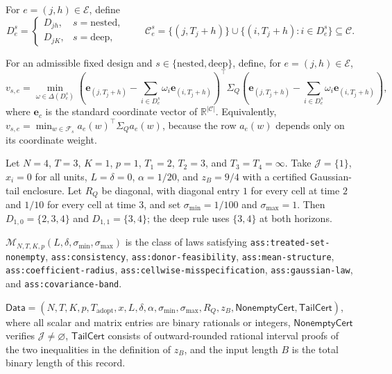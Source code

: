 For \(e=(j,h)\in\mathcal E\), define
\[
 D^s_e=
 \begin{cases}
 D_{jh},&s=\mathrm{nested},\\
 D_{jK},&s=\mathrm{deep},
 \end{cases}
 \qquad
 \mathcal C^s_e=
 \{(j,T_j+h)\}\cup\{(i,T_j+h):i\in D^s_e\}\subseteq\mathcal C.
\]

For an admissible fixed design and \(s\in\{\mathrm{nested},\mathrm{deep}\}\),
define, for \(e=(j,h)\in\mathcal E\),
\[
 v_{s,e}=\min_{\omega\in\Delta(D^s_e)}
 \left(\mathbf e_{(j,T_j+h)}-
       \sum_{i\in D^s_e}\omega_i\mathbf e_{(i,T_j+h)}\right)^{\!\top}
 \Sigma_Q
 \left(\mathbf e_{(j,T_j+h)}-
       \sum_{i\in D^s_e}\omega_i\mathbf e_{(i,T_j+h)}\right),
\]
where \(\mathbf e_c\) is the standard coordinate vector of
\(\mathbb R^{|\mathcal C|}\).  Equivalently,
\(v_{s,e}=\min_{w\in\mathcal F_s}a_e(w)^{\top}\Sigma_Qa_e(w)\), because the
row \(a_e(w)\) depends only on its coordinate weight.

Let \(N=4\), \(T=3\), \(K=1\), \(p=1\), \(T_1=2\), \(T_2=3\), and
\(T_3=T_4=\infty\).  Take \(\mathcal J=\{1\}\), \(x_i=0\) for all units,
\(L=\delta=0\), \(\alpha=1/20\), and \(z_B=9/4\) with a certified
Gaussian-tail enclosure.  Let \(R_Q\) be diagonal, with diagonal entry \(1\)
for every cell at time \(2\) and \(1/10\) for every cell at time \(3\), and
set \(\sigma_{\min}=1/100\) and \(\sigma_{\max}=1\).  Then
\(D_{1,0}=\{2,3,4\}\) and \(D_{1,1}=\{3,4\}\); the deep rule uses
\(\{3,4\}\) at both horizons.

\(\mathcal M_{N,T,K,p}(L,\delta,\sigma_{\min},\sigma_{\max})\) is the class
of laws satisfying \texttt{ass:treated-set-nonempty},
\texttt{ass:consistency}, \texttt{ass:donor-feasibility},
\texttt{ass:mean-structure}, \texttt{ass:coefficient-radius},
\texttt{ass:cellwise-misspecification}, \texttt{ass:gaussian-law}, and
\texttt{ass:covariance-band}.

\(\mathsf{Data}=(N,T,K,p,T_{\mathrm{adopt}},x,L,\delta,\alpha,
\sigma_{\min},\sigma_{\max},R_Q,z_B,\mathsf{NonemptyCert},
\mathsf{TailCert})\), where all scalar and matrix entries are binary rationals
or integers, \(\mathsf{NonemptyCert}\) verifies
\(\mathcal J\ne\varnothing\), \(\mathsf{TailCert}\) consists of
outward-rounded rational interval proofs of the two inequalities in the
definition of \(z_B\), and the input length \(B\) is the total binary length
of this record.

